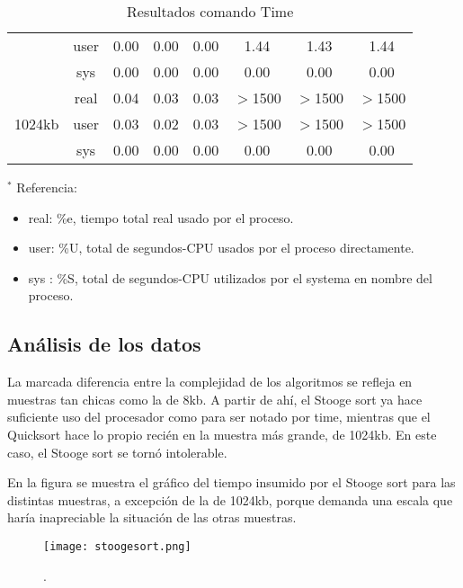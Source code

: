 \documentclass[a4paper,10pt]{article}
\begin{document}
\begin{table}[!htp]
\begin{center}
\begin{tabular}{cc|c|c|c|c|c|c|}
\multicolumn{1}{|c}{}                        &
\multicolumn{1}{|c|}{user} & 0.00 & 0.00 &0.00 & 1.44 & 1.43 & 1.44 \\ \cline{2-8}
\multicolumn{1}{|c}{}                        &
\multicolumn{1}{|c|}{sys} & 0.00 & 0.00 &0.00 & 0.00 & 0.00 & 0.00 \\ \cline{1-8}
\multicolumn{1}{|c}{\multirow{3}{*}{1024kb}} &
\multicolumn{1}{|c|}{real} & 0.04 & 0.03 &0.03 & $>$1500 & $>$1500 & $>$1500 \\ \cline{2-8}
\multicolumn{1}{|c}{}                        &
\multicolumn{1}{|c|}{user} & 0.03 & 0.02 &0.03 & $>$1500 & $>$1500 & $>$1500 \\ \cline{2-8}
\multicolumn{1}{|c}{}                        &
\multicolumn{1}{|c|}{sys} & 0.00 & 0.00 &0.00 & 0.00 & 0.00 & 0.00 \\ \cline{1-8}
\end{tabular}
\caption{Resultados comando Time } \label{tab001}
\end{center}
\end{table}

$^{*}$ Referencia: 
\begin{itemize}
 \item real: \%e, tiempo total real usado por el proceso.
 \item user: \%U, total de segundos-CPU usados por el proceso directamente.
 \item sys : \%S, total de segundos-CPU utilizados por el systema en nombre del proceso.
\end{itemize}



\subsection{An\'alisis de los datos}

La marcada diferencia entre la complejidad de los algoritmos se refleja en muestras tan chicas como la de 8kb. 
A partir de ah\'i, el Stooge sort ya hace suficiente uso del procesador como para ser notado por time, mientras que el Quicksort hace lo propio reci\'en en la muestra m\'as grande, de 1024kb. En este caso, el Stooge sort se torn\'o intolerable.

En la figura se muestra el gr\'afico del tiempo insumido por el Stooge sort para las distintas muestras, a excepci\'on de la de 1024kb, porque demanda una escala que har\'ia inapreciable la situaci\'on de las otras muestras.


\begin{figure}[!htp]
\begin{center}
\texttt{[image: stoogesort.png]}
\end{center}
\caption{.} \label{fig002}
\end{figure}
\end{document}
